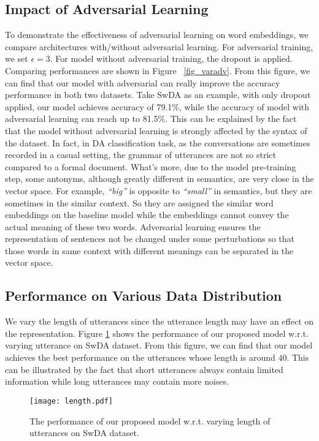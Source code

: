 \documentclass[conference]{IEEEtran}
\begin{document}
	\subsection{Impact of Adversarial Learning}
	To demonstrate the effectiveness of adversarial learning on word embeddings, we compare architectures with/without adversarial learning. For adversarial training, we set $\epsilon = 3$. For model without adversarial training, the dropout is applied. Comparing performances are shown in Figure ~\ref{fig_varadv}. From this figure, we can find that our model with adversarial can really improve the accuracy performance in both two datasets. Take SwDA as an example, with only dropout applied, our model achieves accuracy of 79.1\%, while the accuracy of model with adversarial learning can reach up to 81.5\%. This can be explained by the fact that the model without adversarial learning is strongly affected by the syntax of the dataset. In fact, in DA classification task, as the conversations are sometimes recorded in a casual setting, the grammar of utterances are not so strict compared to a formal document. What's more, due to the model pre-training step, some antonyms, although greatly different in semantics, are very close in the vector space. For example, \emph{``big''} is opposite to \emph{``small''} in semantics, but they are sometimes in the similar context. So they are assigned the similar word embeddings on the baseline model while the embeddings cannot convey the actual meaning of these two words. Adversarial learning ensures the representation of sentences not be changed under some perturbations so that those words in same context with different meanings can be separated in the vector space.
	
	\subsection{Performance on Various Data Distribution}
	We vary the length of utterances since the utterance length may have an effect on the representation. Figure \ref{fig_var_length_performance} shows the performance of our proposed model w.r.t. varying utterance on SwDA dataset. From this figure, we can find that our model achieves the best performance on the utterances whose length is around $40$. This can be illustrated by the fact that short utterances always contain limited information while long utterances may contain more noises.
	
	\begin{figure}[!t]
		\centering
		\texttt{[image: length.pdf]}
		\caption{The performance of our proposed model w.r.t. varying length of utterances on SwDA dataset.}
		\label{fig_var_length_performance}
	\end{figure}
	
\end{document}
